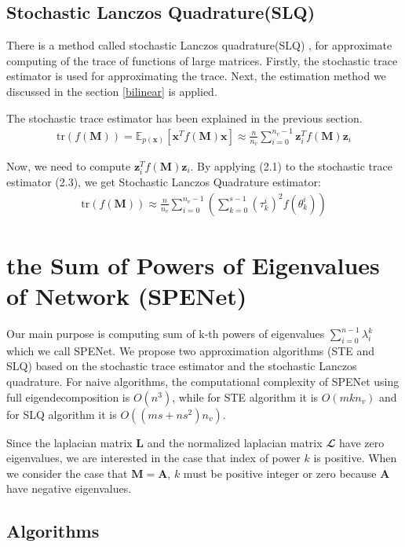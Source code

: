\documentclass[senior,final,11pt]{iscs-thesis}
\begin{document}
\section{Stochastic Lanczos Quadrature(SLQ)}
There is a method called stochastic Lanczos quadrature(SLQ) \cite{ubaru2017fast}, for approximate computing of the trace of functions of large matrices. Firstly, the stochastic trace estimator is used for approximating the trace. Next, the estimation method we discussed in the section \ref{bilinear} is applied.

The stochastic trace estimator has been explained in the previous section.
\begin{align}
    \mathrm{tr}(f(\mathbf{M})) =\mathbb{E}_{p(\mathbf{x})}[\mathbf{x}^{T}f(\mathbf{M})\mathbf{x}] \approx \frac{n}{n_v}\sum_{i=0}^{n_v-1} \mathbf{z}_i^{T}f(\mathbf{M})\mathbf{z}_i
\end{align}

Now, we need to compute $\mathbf{z}_i^{T}f(\mathbf{M})\mathbf{z}_i$. By applying (2.1) to the stochastic trace estimator (2.3), we get Stochastic Lanczos Quadrature estimator:
\begin{align}
    \mathrm{tr}(f(\mathbf{M})) \approx \frac{n}{n_v} \sum_{i=0}^{n_v-1}\left(\sum_{k=0}^{s-1} (\tau_k^i)^2 f(\theta_k^i) \right)
\end{align}




\chapter{the Sum of Powers of Eigenvalues of Network (SPENet)}
Our main purpose is computing sum of k-th powers of eigenvalues $\sum_{i=0}^{n-1} \lambda_i^k$ which we call SPENet. We propose two approximation algorithms (STE and SLQ) based on the stochastic trace estimator and the stochastic Lanczos quadrature. For naive algorithms, the computational complexity of SPENet using full eigendecomposition is $O(n^3)$, while for STE algorithm it is $O(m k n_v)$ and for SLQ algorithm it is $O((ms + ns^2) n_v)$.

Since the laplacian matrix ${\mathbf L}$ and the normalized laplacian matrix ${\mathbfcal L}$ have zero eigenvalues, we are interested in the case that index of power $k$ is positive. When we consider the case that ${\mathbf M} = {\mathbf A}$, $k$ must be positive integer or zero because ${\mathbf A}$ have negative eigenvalues.


\section{Algorithms}
\end{document}
